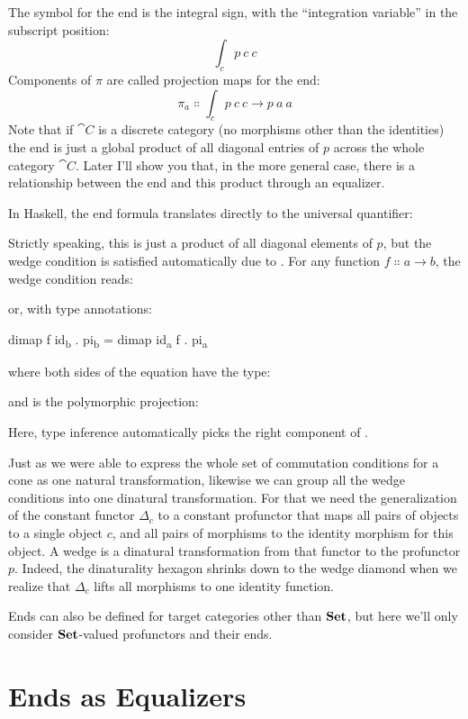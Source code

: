 \noindent
The symbol for the end is the integral sign, with the ``integration
variable'' in the subscript position:
\[\int_c p\ c\ c\]
Components of $\pi$ are called projection maps for the end:
\[\pi_a \Colon \int_c p\ c\ c \to p\ a\ a\]
Note that if $\cat{C}$ is a discrete category (no morphisms other than
the identities) the end is just a global product of all diagonal entries
of $p$ across the whole category $\cat{C}$. Later I'll show you
that, in the more general case, there is a relationship between the end
and this product through an equalizer.

In Haskell, the end formula translates directly to the universal
quantifier:

Strictly speaking, this is just a product of all diagonal elements of
$p$, but the wedge condition is satisfied automatically due to
. For any function
$f \Colon a \to b$, the wedge condition reads:

or, with type annotations:

\begin{snipv}
dimap f id\textsubscript{b} . pi\textsubscript{b} = dimap id\textsubscript{a} f . pi\textsubscript{a}
\end{snipv}
where both sides of the equation have the type:

and  is the polymorphic projection:

Here, type inference automatically picks the right component of
.

Just as we were able to express the whole set of commutation conditions
for a cone as one natural transformation, likewise we can group all the
wedge conditions into one dinatural transformation. For that we need the
generalization of the constant functor $\Delta_c$ to a constant
profunctor that maps all pairs of objects to a single object $c$,
and all pairs of morphisms to the identity morphism for this object. A
wedge is a dinatural transformation from that functor to the profunctor
$p$. Indeed, the dinaturality hexagon shrinks down to the wedge
diamond when we realize that $\Delta_c$ lifts all morphisms to one
identity function.

Ends can also be defined for target categories other than $\mathbf{Set}$,
but here we'll only consider $\mathbf{Set}$-valued profunctors and their
ends.

\section{Ends as Equalizers}


